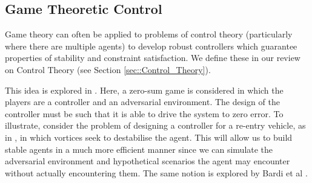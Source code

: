 \documentclass[.../main.tex]{subfiles}
\begin{document}
\subsection{Game Theoretic Control} \label{Game Theoretic Control}

Game theory can often be applied to problems of control theory
(particularly where there are multiple agents) to develop robust
controllers which guarantee properties of stability and constraint
satisfaction. We define these in our review on Control Theory (see Section 
\ref{sec::Control_Theory}).

This idea is explored in \cite{Marden2018AnnualControl}. Here, a
zero-sum game is considered in which the players are a controller and
an adversarial environment. The design of the controller must be such
that it is able to drive the system to zero error. To illustrate,
consider the problem of designing a controller for a re-entry vehicle,
as in \cite{Breitner1994ReentryGame}, in which vortices seek to
destabilise the agent. This will allow us to build stable agents in a
much more efficient manner since we can simulate the adversarial
environment and hypothetical scenarios the agent may encounter without
actually encountering them. The same notion is explored by Bardi et al
\cite{Bardi1991DifferentialDisturbances}.
\end{document}
